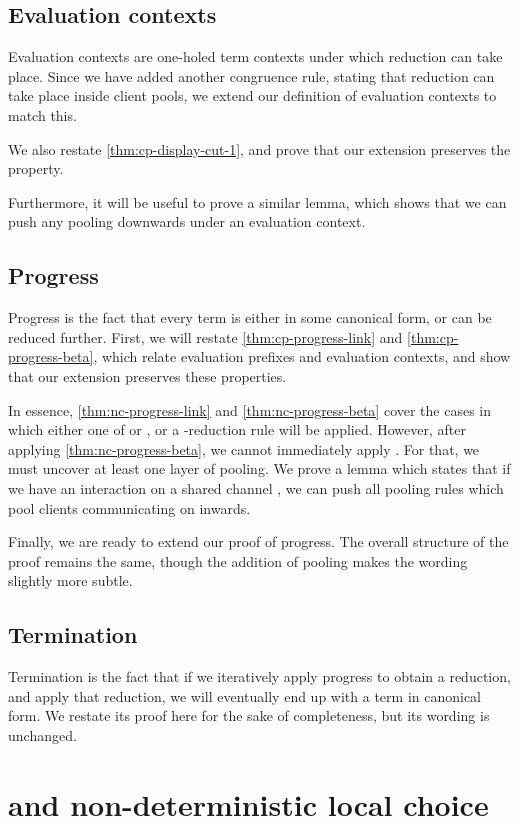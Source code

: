 \subsection{Evaluation contexts}
Evaluation contexts are one-holed term contexts under which reduction can take
place. Since we have added another congruence rule, stating that reduction can
take place inside client pools, we extend our definition of evaluation contexts
to match this.

We also restate \cref{thm:cp-display-cut-1}, and prove that our extension
preserves the property.

Furthermore, it will be useful to prove a similar lemma, which shows that we can
push any pooling downwards under an evaluation context.


\subsection{Progress}
Progress is the fact that every term is either in some canonical form, or can be
reduced further.
First, we will restate \cref{thm:cp-progress-link} and \cref{thm:cp-progress-beta},
which relate evaluation prefixes and evaluation contexts, and show that our
extension preserves these properties. 


In essence, \cref{thm:nc-progress-link} and \cref{thm:nc-progress-beta} cover
the cases in which either one of  or , or a
\textbeta-reduction rule will be applied.
However, after applying \cref{thm:nc-progress-beta}, we cannot immediately apply
. For that, we must uncover at least one layer of pooling.
We prove a lemma which states that if we have an interaction on a shared channel
, we can push all pooling rules which pool clients communicating on 
inwards. 

Finally, we are ready to extend our proof of progress. The overall structure of
the proof remains the same, though the addition of pooling makes the wording
slightly more subtle.


\subsection{Termination}
Termination is the fact that if we iteratively apply progress to obtain a
reduction, and apply that reduction, we will eventually end up with a term in
canonical form.
We restate its proof here for the sake of completeness, but its wording is
unchanged.


\section{\nodcap and non-deterministic local choice}
